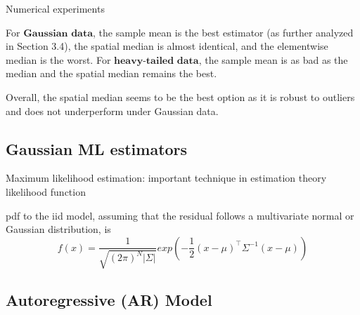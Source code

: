 Numerical experiments

For $\textbf{Gaussian data}$, the sample mean is the best estimator (as further analyzed in Section 3.4), the spatial median is almost identical, and the elementwise median is the worst. 
For $\textbf{heavy-tailed data}$, the sample mean is as bad as the median and the spatial median remains the best. 

Overall, the spatial median seems to be the best option as it is robust to outliers and does not underperform under Gaussian data.

\subsection{Gaussian ML estimators}
Maximum likelihood estimation: important technique in estimation theory
likelihood function

pdf to the iid model, assuming that the residual follows a multivariate normal or Gaussian distribution, is 
\[f(x) = \frac{1}{\sqrt{(2\pi)^N|\Sigma|}}exp(-\frac{1}{2}(x-\mu)^\intercal\Sigma^{-1}(x-\mu))\]


\subsection{Autoregressive (AR) Model}


    
    

